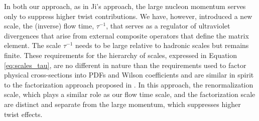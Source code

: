 In both our approach, as in Ji's approach, 
the large nucleon momentum serves only to suppress higher 
twist contributions. We have, however, introduced a new scale, the (inverse) 
flow time, $\tau^{-1}$,  that serves as a regulator of ultraviolet divergences 
that arise from external composite operators  that define the matrix element. The 
scale $\tau^{-1}$ needs to be large relative to hadronic scales but remains 
finite. These 
requirements for the hierarchy of scales, expressed in Equation 
\eqref{eq:scales_tau}, are no different in nature than the requirements used to 
factor physical cross-sections into PDFs and Wilson coefficients and are 
similar in spirit to the factorization approach proposed in 
\cite{Ma:2014jla,Ishikawa:2016znu}. In this approach, the renormalization 
scale, which plays a similar role as our flow time scale,
and the factorization scale are distinct and separate from the large momentum, 
which suppresses higher twist effects. 

